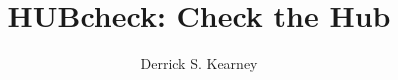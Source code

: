 \documentclass[ece,thesis]{puthesis}
\title{HUBcheck: Check the Hub}
\author{Derrick S. Kearney}{Kearney, Derrick S.}
\begin{document}
\volume

















%
%
%

% 
% 

%

\end{document}
